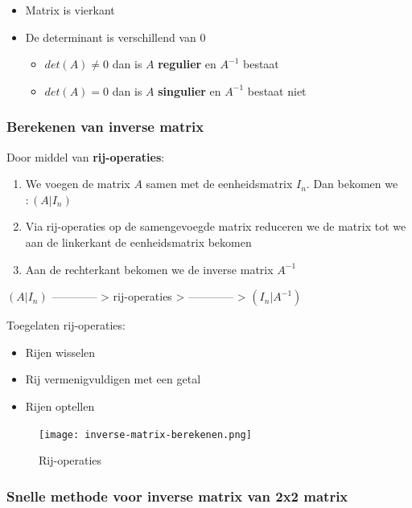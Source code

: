 \documentclass{article}
\begin{document}
\begin{itemize}
    \item Matrix is vierkant
    \item De determinant is verschillend van $0$
    \begin{itemize}
        \item $det(A) \neq 0$ dan is $A$ \textbf{regulier} en $A^{-1}$ bestaat
        \item $det(A) = 0$ dan is $A$ \textbf{singulier} en $A^{-1}$ bestaat niet
    \end{itemize}
\end{itemize}

\subsubsection{Berekenen van inverse matrix}

Door middel van \textbf{rij-operaties}: 

\begin{enumerate}
    \item We voegen de matrix $A$ samen met de eenheidsmatrix $I_n$. Dan bekomen we $: (A | I_n)$
    \item Via rij-operaties op de samengevoegde matrix reduceren we de matrix tot we aan de linkerkant de eenheidsmatrix bekomen
    \item Aan de rechterkant bekomen we de inverse matrix $A^{-1}$
\end{enumerate}

$(A | I_n)$ ------------ > rij-operaties > ------------ > $(I_n | A^{-1})$

Toegelaten rij-operaties:

\begin{itemize}
    \item Rijen wisselen
    \item Rij vermenigvuldigen met een getal
    \item Rijen optellen
\end{itemize}

\begin{figure}[H]
    \centering
    \texttt{[image: inverse-matrix-berekenen.png]}
    \caption{Rij-operaties}
\end{figure}

\subsubsection{Snelle methode voor inverse matrix van 2x2 matrix}
\end{document}
